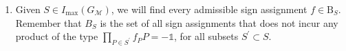 \documentclass[10pt,aps,pra,twocolumn,floatfix,nofootinbib,superscriptaddress,longbibliography]{revtex4-2}
\newcommand{\1}{\mathbbm{1}}
\begin{document}
\begin{enumerate}
     \item Given $S \in I_\mathrm{max}(G_\mathcal M)$, we will find every admissible sign assignment $ f \in \mathrm B_S$. Remember that $B_S$ is the set of all sign assignments that does not incur any product of the type $\prod_{P\in S^\prime}f_P P=-\mathds{1}$, for all subsets $S^\prime\subset S$.
\end{enumerate}
\end{document}
